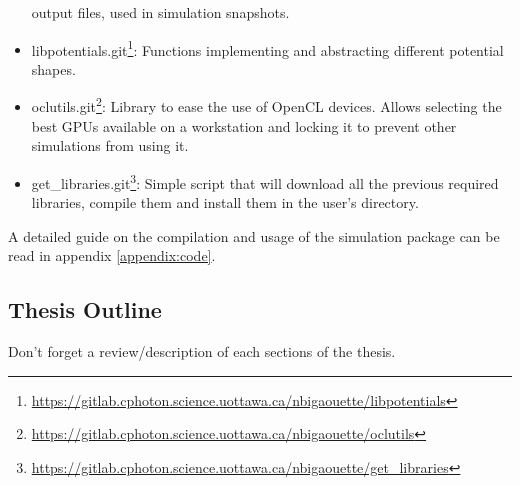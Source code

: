 \begin{itemize}
output files, used in simulation snapshots.
\item libpotentials.git\footnote{ \url{
    https://gitlab.cphoton.science.uottawa.ca/nbigaouette/libpotentials}}:
    Functions implementing and abstracting different potential shapes.
\item oclutils.git\footnote{ \url{
    https://gitlab.cphoton.science.uottawa.ca/nbigaouette/oclutils}}:
    Library to ease the use of OpenCL devices. Allows selecting the best GPUs
    available on a workstation and locking it to prevent other simulations from
    using it.
\item get\_libraries.git\footnote{ \url{
    https://gitlab.cphoton.science.uottawa.ca/nbigaouette/get_libraries}}:
    Simple script that will download all the previous required libraries,
    compile them and install them in the user's directory.
\end{itemize}
A detailed guide on the compilation and usage of the simulation package can be
read in appendix \ref{appendix:code}.


\subsection{Thesis Outline}
Don't forget a review/description of each sections of the thesis.



